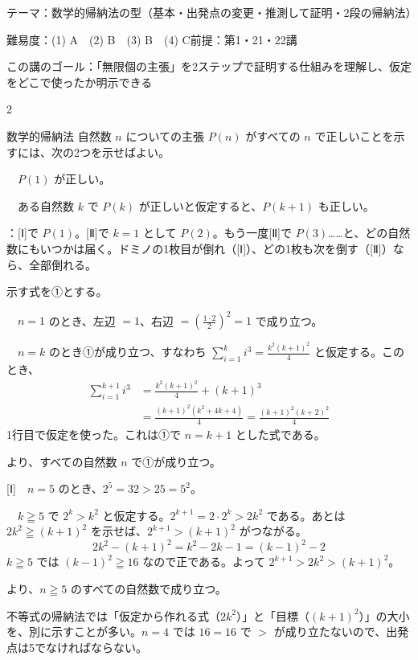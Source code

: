 \documentclass[paper=b5j, fontsize=8pt, fleqn, twoside]{jlreq}
\begin{document}
\begin{Data}
  テーマ：数学的帰納法の型（基本・出発点の変更・推測して証明・2段の帰納法）\par
  難易度：(1) A　(2) B　(3) B　(4) C\quad 前提：第1・21・22講\par
  この講のゴール：「無限個の主張」を2ステップで証明する仕組みを理解し、仮定をどこで使ったか明示できる
\end{Data}

\begin{multicols*}{2}
  \begin{koushiki}{数学的帰納法}
    自然数 $n$ についての主張 $P(n)$ がすべての $n$ で正しいことを示すには、次の2つを示せばよい。\par
    \textgt{[Ⅰ]}　$P(1)$ が正しい。\par
    \textgt{[Ⅱ]}　ある自然数 $k$ で $P(k)$ が正しいと仮定すると、$P(k+1)$ も正しい。
  \end{koushiki}
  ：[Ⅰ]で $P(1)$。[Ⅱ]で $k=1$ として $P(2)$。もう一度[Ⅱ]で $P(3)$……と、どの自然数にもいつかは届く。ドミノの1枚目が倒れ（[Ⅰ]）、どの1枚も次を倒す（[Ⅱ]）なら、全部倒れる。

  示す式を①とする。\par
  [Ⅰ]　$n=1$ のとき、左辺 $=1$、右辺 $=\left(\frac{1\cdot2}2\right)^2=1$ で成り立つ。\par
  [Ⅱ]　$n=k$ のとき①が成り立つ、すなわち $\sum_{i=1}^ki^3=\frac{k^2(k+1)^2}4$ と仮定する。このとき、
  \[
  \begin{aligned}
  \sum_{i=1}^{k+1}i^3&=\frac{k^2(k+1)^2}4+(k+1)^3\\
  &=\frac{(k+1)^2(k^2+4k+4)}4=\frac{(k+1)^2(k+2)^2}4
  \end{aligned}
  \]
  1行目で仮定を使った。これは①で $n=k+1$ とした式である。\par
  [Ⅰ][Ⅱ]より、すべての自然数 $n$ で①が成り立つ。\QED

  [Ⅰ]　$n=5$ のとき、$2^5=32>25=5^2$。\par
  [Ⅱ]　$k\geqq5$ で $2^k>k^2$ と仮定する。$2^{k+1}=2\cdot2^k>2k^2$ である。あとは $2k^2\geqq(k+1)^2$ を示せば、$2^{k+1}>(k+1)^2$ がつながる。
  \[2k^2-(k+1)^2=k^2-2k-1=(k-1)^2-2\]
  $k\geqq5$ では $(k-1)^2\geqq16$ なので正である。よって $2^{k+1}>2k^2>(k+1)^2$。\par
  [Ⅰ][Ⅱ]より、$n\geqq5$ のすべての自然数で成り立つ。\QED

  \begin{memo}
    不等式の帰納法では「仮定から作れる式（$2k^2$）」と「目標（$(k+1)^2$）」の大小を、別に示すことが多い。$n=4$ では $16=16$ で $>$ が成り立たないので、出発点は5でなければならない。
  \end{memo}


\end{multicols*}
\end{document}
